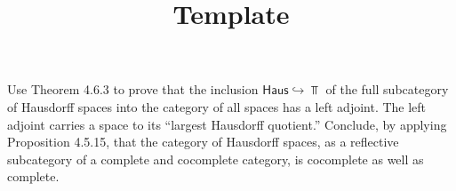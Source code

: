 \documentclass[../../solutions]{subfiles}
\title{Template}
\author{}
\begin{document}
\maketitle

%   

\begin{exercise}
  Use Theorem 4.6.3 to prove that the inclusion
  $\mathsf{Haus}\hookrightarrow\Top$ of the full subcategory of
  Hausdorff spaces into the category of all spaces has a left adjoint.
  The left adjoint carries a space to its ``largest Hausdorff
  quotient.''  Conclude, by applying Proposition 4.5.15, that the
  category of Hausdorff spaces, as a reflective subcategory of a
  complete and cocomplete category, is cocomplete as well as complete.
\end{exercise}
\end{document}
